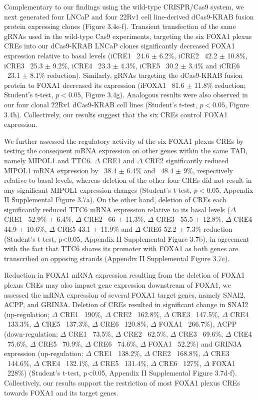 Complementary to our findings using the wild-type CRISPR/Cas9 system, we next generated four LNCaP and four 22Rv1 cell line-derived dCas9-KRAB fusion protein expressing clones (Figure 3.4e-f).
Transient transfection of the same gRNAs used in the wild-type Cas9 experiments, targeting the six FOXA1 plexus CREs into our dCas9-KRAB LNCaP clones significantly decreased FOXA1 expression relative to basal levels (iCRE1 ~24.6 $\pm$ 6.2\%, iCRE2 ~42.2 $\pm$ 10.8\%, iCRE3 ~25.3 $\pm$ 9.2\%, iCRE4 ~23.3 $\pm$ 4.3\%, iCRE5 ~30.2 $\pm$ 3.4\% and iCRE6 ~23.1 $\pm$ 8.1\% reduction).
Similarly, gRNAs targeting the dCas9-KRAB fusion protein to FOXA1 decreased its expression (iFOXA1 ~81.6 $\pm$ 11.8\% reduction; Student’s t-test, $p<0.05$, Figure 3.4g).
Analogous results were also observed in our four clonal 22Rv1 dCas9-KRAB cell lines (Student’s t-test, $p<0.05$, Figure 3.4h).
Collectively, our results suggest that the six CREs control FOXA1 expression.

We further assessed the regulatory activity of the six FOXA1 plexus CREs by testing the consequent mRNA expression on other genes within the same TAD, namely MIPOL1 and TTC6.
$\Delta$ CRE1 and $\Delta$ CRE2 significantly reduced MIPOL1 mRNA expression by ~38.4 $\pm$ 6.4\% and ~48.4 $\pm$ 9\%, respectively relative to basal levels, whereas deletion of the other four CREs did not result in any significant MIPOL1 expression changes (Student’s t-test, $p<0.05$, Appendix II Supplemental Figure 3.7a).
On the other hand, deletion of CREs each significantly reduced TTC6 mRNA expression relative to its basal levels ($\Delta$ CRE1 ~52.9\% $\pm$ 6.4\%, $\Delta$ CRE2 ~66 $\pm$ 11.3\%, $\Delta$ CRE3 ~55.5 $\pm$ 12.8\%, $\Delta$ CRE4 44.9 $\pm$ 10.6\%, $\Delta$ CRE5 43.1 $\pm$ 11.9\% and $\Delta$ CRE6 52.2 $\pm$ 7.3\% reduction (Student’s t-test, p<0.05, Appendix II Supplemental Figure 3.7b), in agreement with the fact that TTC6 shares its promoter with FOXA1 as both genes are transcribed on opposing strands (Appendix II Supplemental Figure 3.7c).

Reduction in FOXA1 mRNA expression resulting from the deletion of FOXA1 plexus CREs may also impact gene expression downstream of FOXA1, we assessed the mRNA expression of several FOXA1 target genes, namely SNAI2, ACPP, and GRIN3A.
Deletion of CREs resulted in significant change in SNAI2 (up-regulation; $\Delta$ CRE1 ~190\%, $\Delta$ CRE2 ~162.8\%, $\Delta$ CRE3 ~147.5\%, $\Delta$ CRE4 ~133.3\%, $\Delta$ CRE5 ~137.3\%, $\Delta$ CRE6 ~120.8\%, $\Delta$ FOXA1 ~266.7\%), ACPP (down-regulation; $\Delta$ CRE1 ~73.5\%, $\Delta$ CRE2 ~62.5\%, $\Delta$ CRE3 ~69.6\%, $\Delta$ CRE4 ~75.6\%, $\Delta$ CRE5 ~70.9\%, $\Delta$ CRE6 ~74.6\%, $\Delta$ FOXA1 ~52.2\%) and GRIN3A expression (up-regulation; $\Delta$ CRE1 ~138.2\%, $\Delta$ CRE2 ~168.8\%, $\Delta$ CRE3 ~144.6\%, $\Delta$ CRE4 ~132.1\%, $\Delta$ CRE5 ~131.4\%, $\Delta$ CRE6 ~127\%, $\Delta$ FOXA1 ~228\%) (Student’s t-test, p<0.05, Appendix II Supplemental Figure 3.7d-f).
Collectively, our results support the restriction of most FOXA1 plexus CREs towards FOXA1 and its target genes.

